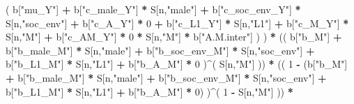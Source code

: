 \documentclass[
]{book}
\newenvironment{Shaded}{\begin{snugshade}}{\end{snugshade}}
\newcommand{\DecValTok}[1]{\textcolor[rgb]{0.00,0.00,0.81}{#1}}
\newcommand{\NormalTok}[1]{#1}
\newcommand{\SpecialCharTok}[1]{\textcolor[rgb]{0.81,0.36,0.00}{\textbf{#1}}}
\newcommand{\StringTok}[1]{\textcolor[rgb]{0.31,0.60,0.02}{#1}}
\begin{document}
\begin{Shaded}
\begin{Highlighting}[]
\NormalTok{                           ( b[}\StringTok{"mu\_Y"}\NormalTok{] }\SpecialCharTok{+} 
\NormalTok{                               b[}\StringTok{"c\_male\_Y"}\NormalTok{] }\SpecialCharTok{*}\NormalTok{ S[n,}\StringTok{"male"}\NormalTok{] }\SpecialCharTok{+} 
\NormalTok{                               b[}\StringTok{"c\_soc\_env\_Y"}\NormalTok{] }\SpecialCharTok{*}\NormalTok{ S[n,}\StringTok{"soc\_env"}\NormalTok{] }\SpecialCharTok{+} 
\NormalTok{                               b[}\StringTok{"c\_A\_Y"}\NormalTok{] }\SpecialCharTok{*} \DecValTok{0} \SpecialCharTok{+} 
\NormalTok{                               b[}\StringTok{"c\_L1\_Y"}\NormalTok{] }\SpecialCharTok{*}\NormalTok{ S[n,}\StringTok{"L1"}\NormalTok{] }\SpecialCharTok{+}
\NormalTok{                               b[}\StringTok{"c\_M\_Y"}\NormalTok{] }\SpecialCharTok{*}\NormalTok{ S[n,}\StringTok{"M"}\NormalTok{] }\SpecialCharTok{+} 
\NormalTok{                               b[}\StringTok{"c\_AM\_Y"}\NormalTok{] }\SpecialCharTok{*} \DecValTok{0} \SpecialCharTok{*}\NormalTok{ S[n,}\StringTok{"M"}\NormalTok{] }\SpecialCharTok{*}\NormalTok{ b[}\StringTok{"A.M.inter"}\NormalTok{] ) ) }\SpecialCharTok{*}
\NormalTok{      (( b[}\StringTok{"b\_M"}\NormalTok{] }\SpecialCharTok{+} 
\NormalTok{           b[}\StringTok{"b\_male\_M"}\NormalTok{] }\SpecialCharTok{*}\NormalTok{ S[n,}\StringTok{"male"}\NormalTok{] }\SpecialCharTok{+} 
\NormalTok{           b[}\StringTok{"b\_soc\_env\_M"}\NormalTok{] }\SpecialCharTok{*}\NormalTok{ S[n,}\StringTok{"soc\_env"}\NormalTok{] }\SpecialCharTok{+} 
\NormalTok{           b[}\StringTok{"b\_L1\_M"}\NormalTok{] }\SpecialCharTok{*}\NormalTok{ S[n,}\StringTok{"L1"}\NormalTok{] }\SpecialCharTok{+}
\NormalTok{           b[}\StringTok{"b\_A\_M"}\NormalTok{] }\SpecialCharTok{*} \DecValTok{0}\NormalTok{ )}\SpecialCharTok{\^{}}\NormalTok{( S[n,}\StringTok{"M"}\NormalTok{] )) }\SpecialCharTok{*} 
\NormalTok{      (( }\DecValTok{1} \SpecialCharTok{{-}}\NormalTok{ (b[}\StringTok{"b\_M"}\NormalTok{] }\SpecialCharTok{+} 
\NormalTok{                b[}\StringTok{"b\_male\_M"}\NormalTok{] }\SpecialCharTok{*}\NormalTok{ S[n,}\StringTok{"male"}\NormalTok{] }\SpecialCharTok{+} 
\NormalTok{                b[}\StringTok{"b\_soc\_env\_M"}\NormalTok{] }\SpecialCharTok{*}\NormalTok{ S[n,}\StringTok{"soc\_env"}\NormalTok{] }\SpecialCharTok{+} 
\NormalTok{                b[}\StringTok{"b\_L1\_M"}\NormalTok{] }\SpecialCharTok{*}\NormalTok{ S[n,}\StringTok{"L1"}\NormalTok{] }\SpecialCharTok{+}
\NormalTok{                b[}\StringTok{"b\_A\_M"}\NormalTok{] }\SpecialCharTok{*} \DecValTok{0}\NormalTok{) )}\SpecialCharTok{\^{}}\NormalTok{( }\DecValTok{1} \SpecialCharTok{{-}}\NormalTok{ S[n,}\StringTok{"M"}\NormalTok{] ))  }\SpecialCharTok{*}

\end{Highlighting}
\end{Shaded}
\end{document}
